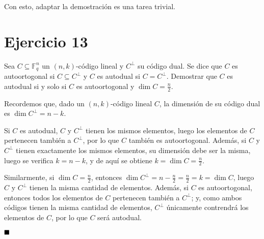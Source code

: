 Con esto, adaptar la demostración es una tarea trivial.

\section{Ejercicio 13}

\begin{formulationBox}
	Sea $C \subseteq \mathbb{F}_q^n$ un $(n, k)$-código lineal y $C^\perp$ su código dual. Se dice que $C$ es autoortogonal si $C \subseteq C^\perp$ y $C$ es autodual si $C = C^\perp$. Demostrar que $C$ es autodual si y solo si $C$ es autoortogonal y $\dim C = \frac{n}{2}$.
\end{formulationBox}

Recordemos que, dado un $(n, k)$-código lineal $C$, la dimensión de su código dual es $\dim C^\perp = n-k$.

Si $C$ es autodual, $C$ y $C^\perp$ tienen los mismos elementos, luego los elementos de $C$ pertenecen también a $C^\perp$, por lo que $C$ también es autoortogonal. Además, si $C$ y $C^\perp$ tienen exactamente los mismos elementos, su dimensión debe ser la misma, luego se verifica $k = n-k$, y de aquí se obtiene $k = \dim C = \frac{n}{2}$.

Similarmente, si $\dim C = \frac{n}{2}$, entonces $\dim C^\perp = n - \frac{n}{2} = \frac{n}{2} = k = \dim C$, luego $C$ y $C^\perp$ tienen la misma cantidad de elementos. Además, si $C$ es autoortogonal, entonces todos los elementos de $C$ pertenecen también a $C^\perp$; y, como ambos códigos tienen la misma cantidad de elementos, $C^\perp$ únicamente contrendrá los elementos de $C$, por lo que $C$ será autodual.

$\qed$
